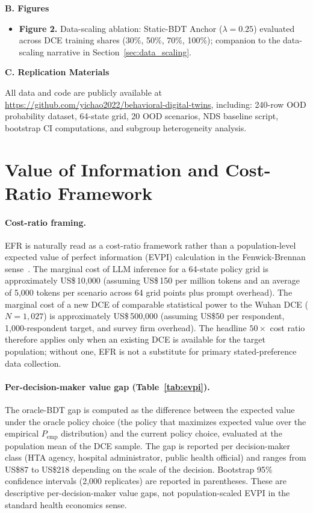 \documentclass[11pt]{article}
\begin{document}
\textbf{B. Figures}
\begin{itemize}\setlength\itemsep{0pt}
\item \textbf{Figure 2.} Data-scaling ablation: Static-BDT Anchor ($\lambda = 0.25$) evaluated across DCE training shares (30\%, 50\%, 70\%, 100\%); companion to the data-scaling narrative in Section~\ref{sec:data_scaling}.
\end{itemize}

\textbf{C. Replication Materials}

All data and code are publicly available at \url{https://github.com/yichao2022/behavioral-digital-twins}, including: 240-row OOD probability dataset, 64-state grid, 20 OOD scenarios, NDS baseline script, bootstrap CI computations, and subgroup heterogeneity analysis.

\appendix
\section{Value of Information and Cost-Ratio Framework}
\label{app:voi}

\paragraph{Cost-ratio framing.} EFR is naturally read as a cost-ratio framework rather than a population-level expected value of perfect information (EVPI) calculation in the Fenwick-Brennan sense~\citep{Fenwick2008EVPI, Briggs2006VOI}. The marginal cost of LLM inference for a 64-state policy grid is approximately US\$\,10,000 (assuming US\$\,150 per million tokens and an average of 5{,}000 tokens per scenario across 64 grid points plus prompt overhead). The marginal cost of a new DCE of comparable statistical power to the Wuhan DCE ($N=1{,}027$) is approximately US\$\,500,000 (assuming US\$50 per respondent, 1{,}000-respondent target, and survey firm overhead). The headline $50\times$ cost ratio therefore applies only when an existing DCE is available for the target population; without one, EFR is not a substitute for primary stated-preference data collection.

\paragraph{Per-decision-maker value gap (Table~\ref{tab:evpi}).} The oracle-BDT gap is computed as the difference between the expected value under the oracle policy choice (the policy that maximizes expected value over the empirical $P_{\text{emp}}$ distribution) and the current policy choice, evaluated at the population mean of the DCE sample. The gap is reported per decision-maker class (HTA agency, hospital administrator, public health official) and ranges from US\$87 to US\$218 depending on the scale of the decision. Bootstrap 95\% confidence intervals (2,000 replicates) are reported in parentheses. These are descriptive per-decision-maker value gaps, not population-scaled EVPI in the standard health economics sense.
\end{document}
